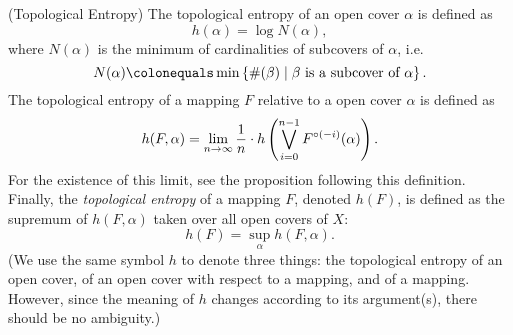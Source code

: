 \documentclass[12pt,twoside,draft]{book}
\begin{document}
\begin{definition}
  (Topological Entropy)
  The topological entropy of an open cover $\alpha$ is defined as
  \begin{equation*}
    h(\alpha) = \log N(\alpha),
  \end{equation*}
  where $N(\alpha)$ is the minimum of cardinalities of subcovers of $\alpha$, i.e.
  \begin{equation*}
    N(\alpha) \ceq \min\setst{ \#(\beta) }{ \beta \mbox{ is a subcover of } \alpha}.
  \end{equation*}
  The topological entropy of a mapping $F$ relative to a open cover $\alpha$ is defined as
  \begin{equation*}
    h(F,\alpha) = \lim\limits_{n \to \infty} \frac{1}{n} \cdot h\left (  \bigvee\limits_{i=0}^{n-1} F^{\circ (-i)}(\alpha)  \right ).
  \end{equation*}
  For the existence of this limit, see the proposition following this definition.
  Finally, the \textit{topological entropy} of a mapping $F$, denoted $h(F)$, is defined as the supremum of $h(F, \alpha)$ taken over all open covers of $X$:
  \begin{equation*}
    h(F) = \sup\limits_\alpha h(F,\alpha).
  \end{equation*}
  (We use the same symbol $h$ to denote three things: the topological entropy of an open cover, of an open cover with respect to a mapping, and of a mapping.
  However, since the meaning of $h$ changes according to its argument(s), there should be no ambiguity.)
  \label{defn:t-entropy}
\end{definition}
\end{document}

